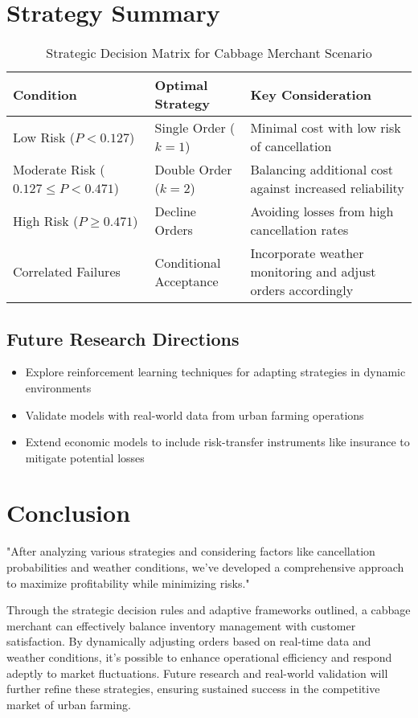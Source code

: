 \documentclass[11pt]{article}
\begin{document}
\section*{Strategy Summary}
\begin{table}[H]
\centering
\begin{tabularx}{0.95\textwidth}{lYY}
\toprule
\textbf{Condition} & \textbf{Optimal Strategy} & \textbf{Key Consideration} \\
\midrule
Low Risk (\( P < 0.127 \)) & Single Order (\( k=1 \)) & Minimal cost with low risk of cancellation \\
Moderate Risk (\( 0.127 \leq P < 0.471 \)) & Double Order (\( k=2 \)) & Balancing additional cost against increased reliability \\
High Risk (\( P \geq 0.471 \)) & Decline Orders & Avoiding losses from high cancellation rates \\
Correlated Failures & Conditional Acceptance & Incorporate weather monitoring and adjust orders accordingly \\
\bottomrule
\end{tabularx}
\caption{Strategic Decision Matrix for Cabbage Merchant Scenario}
\end{table}

\subsection*{Future Research Directions}
\begin{itemize}[leftmargin=*,label=\color{DarkSlateBlue}\textbullet]
  \item Explore reinforcement learning techniques for adapting strategies in dynamic environments
  \item Validate models with real-world data from urban farming operations
  \item Extend economic models to include risk-transfer instruments like insurance to mitigate potential losses
\end{itemize}

\section*{Conclusion}
\begin{thoughtbox}
"After analyzing various strategies and considering factors like cancellation probabilities and weather conditions, we've developed a comprehensive approach to maximize profitability while minimizing risks."
\end{thoughtbox}

Through the strategic decision rules and adaptive frameworks outlined, a cabbage merchant can effectively balance inventory management with customer satisfaction. By dynamically adjusting orders based on real-time data and weather conditions, it's possible to enhance operational efficiency and respond adeptly to market fluctuations. Future research and real-world validation will further refine these strategies, ensuring sustained success in the competitive market of urban farming.
\end{document}
